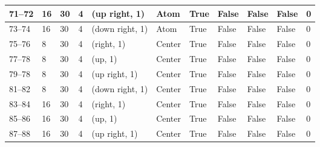 \begin{longtable}{|C{0.9cm}|C{0.8cm}|C{0.8cm}|C{0.8cm}|C{3cm}|C{1.5cm}|C{1.5cm}|C{0.8cm}|C{0.8cm}|C{1cm}|C{1cm}|}
    71--72 &  16 &  30 &  4 & (up right, 1) & Atom & True & False & False & False & 0 \\ \hline

    73--74 &  16 &  30 &  4 & (down right, 1) & Atom & True & False & False & False & 0 \\ \hline
    
    
    75--76 &  8 &  30 &  4 & (right, 1) & Center & True & False & False & False & 0 \\ \hline

    77--78 &  8 &  30 &  4 & (up, 1) & Center & True & False & False & False & 0 \\ \hline

    79--78 &  8 &  30 &  4 & (up right, 1) & Center & True & False & False & False & 0 \\ \hline

    81--82 &  8 &  30 &  4 & (down right, 1) & Center & True & False & False & False & 0 \\ \hline

    83--84 &  16 &  30 &  4 & (right, 1) & Center & True & False & False & False & 0 \\ \hline

    85--86 &  16 &  30 &  4 & (up, 1) & Center & True & False & False & False & 0 \\ \hline

    87--88 &  16 &  30 &  4 & (up right, 1) & Center & True & False & False & False & 0 \\ \hline


\end{longtable}
